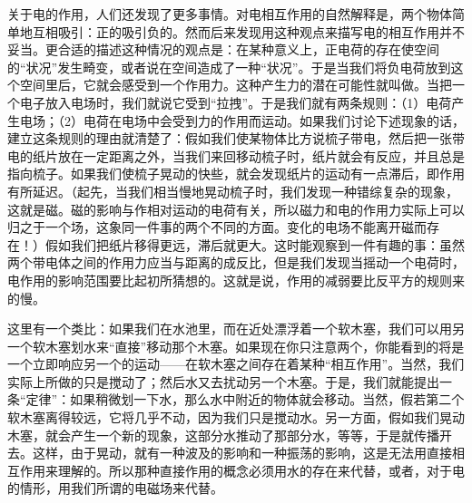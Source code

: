 \documentclass[12pt,oneside]{book}
\begin{document}
关于电的作用，人们还发现了更多事情。对电相互作用的自然解释是，两个物体简单地互相吸引：正的吸引负的。然而后来发现用这种观点来描写电的相互作用并不妥当。更合适的描述这种情况的观点是：在某种意义上，正电荷的存在使空间的“状况”发生畸变，或者说在空间造成了一种“状况”。于是当我们将负电荷放到这个空间里后，它就会感受到一个作用力。这种产生力的潜在可能性就叫做。当把一个电子放入电场时，我们就说它受到“拉拽”。于是我们就有两条规则：（1）电荷产生电场；（2）电荷在电场中会受到力的作用而运动。如果我们讨论下述现象的话，建立这条规则的理由就清楚了：假如我们使某物体比方说梳子带电，然后把一张带电的纸片放在一定距离之外，当我们来回移动梳子时，纸片就会有反应，并且总是指向梳子。如果我们使梳子晃动的快些，就会发现纸片的运动有一点滞后，即作用有所延迟。（起先，当我们相当慢地晃动梳子时，我们发现一种错综复杂的现象，这就是磁。磁的影响与作相对运动的电荷有关，所以磁力和电的作用力实际上可以归之于一个场，这象同一件事的两个不同的方面。变化的电场不能离开磁而存在！）假如我们把纸片移得更远，滞后就更大。这时能观察到一件有趣的事：虽然两个带电体之间的作用力应当与距离的成反比，但是我们发现当摇动一个电荷时，电作用的影响范围要比起初所猜想的。这就是说，作用的减弱要比反平方的规则来的慢。

这里有一个类比：如果我们在水池里，而在近处漂浮着一个软木塞，我们可以用另一个软木塞划水来“直接”移动那个木塞。如果现在你只注意两个，你能看到的将是一个立即响应另一个的运动——在软木塞之间存在着某种“相互作用”。当然，我们实际上所做的只是搅动了；然后水又去扰动另一个木塞。于是，我们就能提出一条“定律”：如果稍微划一下水，那么水中附近的物体就会移动。当然，假若第二个软木塞离得较远，它将几乎不动，因为我们只是搅动水。另一方面，假如我们晃动木塞，就会产生一个新的现象，这部分水推动了那部分水，等等，于是就传播开去。这样，由于晃动，就有一种波及的影响和一种振荡的影响，这是无法用直接相互作用来理解的。所以那种直接作用的概念必须用水的存在来代替，或者，对于电的情形，用我们所谓的电磁场来代替。
\end{document}
